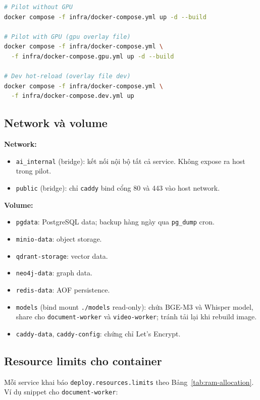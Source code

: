 \begin{lstlisting}[language=bash, caption={Chạy stack theo cấu hình.}]
# Pilot without GPU
docker compose -f infra/docker-compose.yml up -d --build

# Pilot with GPU (gpu overlay file)
docker compose -f infra/docker-compose.yml \
  -f infra/docker-compose.gpu.yml up -d --build

# Dev hot-reload (overlay file dev)
docker compose -f infra/docker-compose.yml \
  -f infra/docker-compose.dev.yml up
\end{lstlisting}

\subsection{Network và volume}

\textbf{Network:}
\begin{itemize}
    \item \texttt{ai\_internal} (bridge): kết nối nội bộ tất cả
          service. Không expose ra host trong pilot.
    \item \texttt{public} (bridge): chỉ \texttt{caddy} bind cổng 80
          và 443 vào host network.
\end{itemize}

\textbf{Volume:}
\begin{itemize}
    \item \texttt{pgdata}: PostgreSQL data; backup hàng ngày qua
          \texttt{pg\_dump} cron.
    \item \texttt{minio-data}: object storage.
    \item \texttt{qdrant-storage}: vector data.
    \item \texttt{neo4j-data}: graph data.
    \item \texttt{redis-data}: AOF persistence.
    \item \texttt{models} (bind mount \texttt{./models} read-only):
          chứa BGE-M3 và Whisper model, share cho \texttt{document-worker}
          và \texttt{video-worker}; tránh tải lại khi rebuild image.
    \item \texttt{caddy-data}, \texttt{caddy-config}: chứng chỉ Let's
          Encrypt.
\end{itemize}

\subsection{Resource limits cho container}

Mỗi service khai báo \texttt{deploy.resources.limits} theo
Bảng~\ref{tab:ram-allocation}. Ví dụ snippet cho \texttt{document-worker}:

